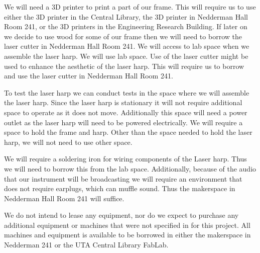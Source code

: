 We will need a 3D printer to print a part of our frame. This will require us to use either the 3D printer in the Central Library, the 3D printer in Nedderman Hall Room 241, or the 3D printers in the Engineering Research Building. If later on we decide to use wood for some of our frame then we will need to borrow the laser cutter in Nedderman Hall Room 241. We will access to lab space when we assemble the laser harp. We will use lab space. Use of the laser cutter might be used to enhance the aesthetic of the laser harp. This will require us to borrow and use the laser cutter in Nedderman Hall Room 241.

To test the laser harp we can conduct tests in the space where we will assemble the laser harp. Since the laser harp is stationary it will not require additional space to operate as it does not move. Additionally this space will need a power outlet as the laser harp will need to be powered electrically. We will require a space to hold the frame and harp. Other than the space needed to hold the laser harp, we will not need to use other space.

We will require a soldering iron for wiring components of the Laser harp. Thus we will need to borrow this from the lab space. Additionally, because of the audio that our instrument will be broadcasting we will require an environment that does not require earplugs, which can muffle sound. Thus the makerspace in Nedderman Hall Room 241 will suffice.

We do not intend to lease any equipment, nor do we expect to purchase any additional equipment or machines that were not specified in for this project. All machines and equipment is available to be borrowed in either the makerspace in Nedderman 241 or the UTA Central Library FabLab.

